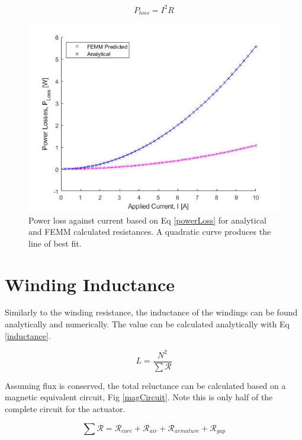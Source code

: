 \documentclass[a4paper]{IEEEtran}
\begin{document}
    \begin{equation}
        P_{loss} = I^2 R
        \label{powerLoss}
    \end{equation}
    
    \begin{figure}[ht]
        \includegraphics[width = \linewidth]{ResistanceWindingLoss.jpg}
        \caption{Power loss against current based on Eq \ref{powerLoss} for analytical and FEMM calculated resistances. A quadratic curve produces the line of best fit.}
        \label{windingLoss} 
    \end{figure}

\section{Winding Inductance}
    Similarly to the winding resistance, the inductance of the windings can be found analytically and numerically. The value can be calculated analytically with Eq \ref{inductance}. 

    \begin{equation}
        L = \frac{N^2}{\sum{\mathcal{R}}}
        \label{inductance}
    \end{equation}

    Assuming flux is conserved, the total reluctance can be calculated based on a magnetic equivalent circuit, Fig \ref{magCircuit}. Note this is only half of the complete circuit for the actuator.


    \begin{equation}
        \sum{\mathcal{R}} = \mathcal{R}_{core} + \mathcal{R}_{air} + \mathcal{R}_{armature} + \mathcal{R}_{gap}
        \label{summm}
    \end{equation}
\end{document}
